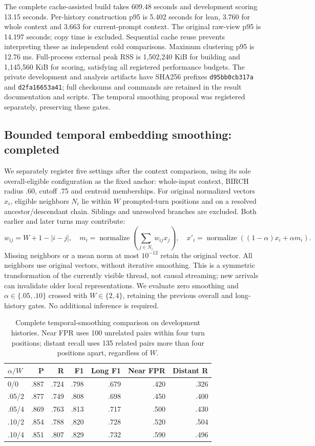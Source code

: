 \documentclass[11pt]{article}
\begin{document}
The complete cache-assisted build takes 609.48 seconds and development scoring
13.15 seconds. Per-history construction p95 is 5.402 seconds for lean, 3.760
for whole context and 3.663 for current-prompt context. The original raw-view
p95 is 14.197 seconds; copy time is excluded. Sequential cache reuse prevents
interpreting these as independent cold comparisons. Maximum clustering p95
is 12.76 ms. Full-process external peak RSS is 1,502,240 KiB for building and
1,145,560 KiB for scoring, satisfying all registered performance budgets.
The private development and analysis artifacts have SHA256 prefixes
\texttt{d95bb0cb317a} and \texttt{d2fa16653a41}; full checksums and commands
are retained in the result documentation and scripts. The temporal smoothing
proposal was registered separately, preserving these gates.

\subsection{Bounded temporal embedding smoothing: completed}
We separately register five settings after the context comparison, using its
sole overall-eligible configuration as the fixed anchor: whole-input context,
BIRCH radius .60, cutoff .75 and centroid memberships. For original normalized
vectors $x_i$, eligible neighbors $N_i$ lie within $W$ prompted-turn positions
and on a resolved ancestor/descendant chain. Siblings and unresolved branches
are excluded. Both earlier and later turns may contribute:
\[
 w_{ij}=W+1-|i-j|,\quad
 m_i=\operatorname{normalize}\!\left(\sum_{j\in N_i}w_{ij}x_j\right),\quad
 x'_i=\operatorname{normalize}\!\left((1-\alpha)x_i+\alpha m_i\right).
\]
Missing neighbors or a mean norm at most $10^{-12}$ retain the original vector.
All neighbors use original vectors, without iterative smoothing. This is a
symmetric transformation of the currently visible thread, not causal streaming;
new arrivals can invalidate older local representations. We evaluate zero
smoothing and $\alpha\in\{.05,.10\}$ crossed with $W\in\{2,4\}$, retaining the
previous overall and long-history gates. No additional inference is required.

\begin{table}[ht]
\centering\small
\begin{tabular}{lrrrrrr}
\toprule
$\alpha/W$ & P & R & F1 & Long F1 & Near FPR & Distant R \\
\midrule
0/0 & .887 & .724 & .798 & .679 & .420 & .326 \\
.05/2 & .877 & .749 & .808 & .698 & .450 & .400 \\
.05/4 & .869 & .763 & .813 & .717 & .500 & .430 \\
.10/2 & .854 & .788 & .820 & .728 & .520 & .504 \\
.10/4 & .851 & .807 & .829 & .732 & .590 & .496 \\
\bottomrule
\end{tabular}
\caption{Complete temporal-smoothing comparison on development histories.
Near FPR uses 100 unrelated pairs within four turn positions; distant recall
uses 135 related pairs more than four positions apart, regardless of $W$.}
\end{table}
\end{document}
